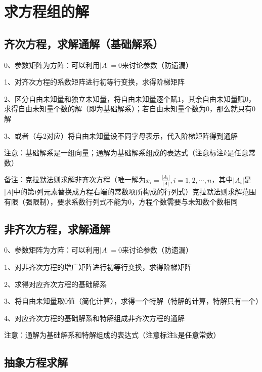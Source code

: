 \section{求方程组的解}



\subsection{齐次方程，求解通解（基础解系）}

0、参数矩阵为方阵：可以利用$|A| = 0$来讨论参数（防遗漏）

1、对齐次方程的系数矩阵进行初等行变换，求得阶梯矩阵

2、区分自由未知量和独立未知量，将自由未知量逐个赋1，其余自由未知量赋0，求得自由未知量个数的解（即为基础解系）；若自由未知量个数为0，那么就只有0解

3、或者（与2对应）将自由未知量设不同字母表示，代入阶梯矩阵得到通解

注意：基础解系是一组向量；通解为基础解系组成的表达式（注意标注$k$是任意常数）

备注：克拉默法则求解非齐次方程（唯一解为$x_i = \frac {|A_i|}{|A|},i=1,2,\cdots, n$，其中$|A_i|$是$|A|$中的第i列元素替换成方程右端的常数项所构成的行列式）克拉默法则求解范围有限（强限制），要求系数行列式不能为0，方程个数需要与未知数个数相同



\subsection{非齐次方程，求解通解}

0、参数矩阵为方阵：可以利用$|A| = 0$来讨论参数（防遗漏）

1、对非齐次方程的增广矩阵进行初等行变换，求得阶梯矩阵

2、求得对应齐次方程的基础解系

3、将自由未知量取0值（简化计算），求得一个特解（特解的计算，特解只有一个）

4、对应齐次方程的基础解系和特解组成非齐次方程的通解

注意：通解为基础解系和特解组成的表达式（注意标注k是任意常数）



\subsection{抽象方程求解}

